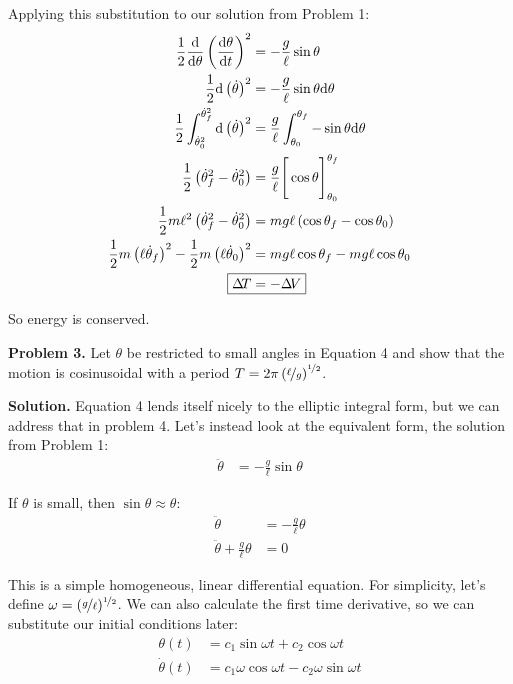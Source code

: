 \documentclass{article}
\begin{document}
Applying this substitution to our solution from Problem 1:
\begin{equation*}
\begin{aligned}
\frac{1}{2}\frac{\dd}{\dd\theta}\left(\frac{\dd\theta}{\dd t}\right)^2 &= -\frac{g}{\ell}\sin\theta \\
\frac{1}{2}\dd\left(\dot{\theta}\right)^2 &= -\frac{g}{\ell}\sin\theta\dd\theta \\
\frac{1}{2}\int_{\dot{\theta}_0^2}^{\dot{\theta}_f^2}\dd\left(\dot{\theta}\right)^ 2&= \frac{g}{\ell}\int_{\theta_0}^{\theta_f}-\sin\theta\dd\theta \\
\frac{1}{2}\left(\dot{\theta}_f^2-\dot{\theta}_0^2\right) &= \frac{g}{\ell}\Bigg[\cos\theta\Bigg]_{\theta_0}^{\theta_f} \\
\frac{1}{2}m\ell ^2\left(\dot{\theta}_f^2-\dot{\theta}_0^2\right) &= mg\ell\left(\cos\theta_f - \cos\theta_0\right) \\
\frac{1}{2}m\left(\ell\dot\theta_f\right)^2 - \frac{1}{2}m\left(\ell\dot\theta_0\right)^2 &= mg\ell\cos\theta_f - mg\ell\cos\theta_0 \\
\Aboxed{\Delta\! T &= -\Delta\! V}
\end{aligned}
\end{equation*}

So energy is conserved.

\textbf{Problem 3.} Let $\theta$ be restricted to small angles in Equation 4 and show that the motion is cosinusoidal with a period $T = 2\pi\left(\nicefrac{\ell}{g}\right)^{\nicefrac{1}{2}}$.

\textbf{Solution.} Equation 4 lends itself nicely to the elliptic integral form, but we can address that in problem 4. Let's instead look at the equivalent form, the solution from Problem 1:
\begin{equation*}
\begin{aligned}
\ddot{\theta} &= -\frac{g}{\ell}\sin\theta
\end{aligned}
\end{equation*}

If $\theta$ is small, then $\sin\theta\approx\theta$:
\begin{equation*}
\begin{aligned}
\ddot{\theta} &= -\frac{g}{\ell}\theta \\
\ddot{\theta} + \frac{g}{\ell}\theta &= 0
\end{aligned}
\end{equation*}

This is a simple homogeneous, linear differential equation. For simplicity, let's define $\omega = (\nicefrac{g}{\ell})^{\nicefrac{1}{2}}$. We can also calculate the first time derivative, so we can substitute our initial conditions later:
\begin{equation*}
\begin{aligned}
\theta (t) &= c_1\sin\omega t + c_2\cos\omega t \\
\dot{\theta}(t) &= c_1\omega\cos\omega t - c_2\omega\sin\omega t
\end{aligned}
\end{equation*}
\end{document}
